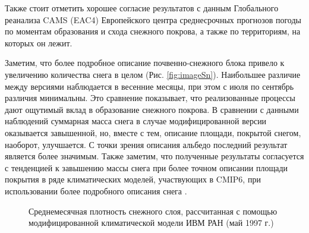 \documentclass[a4paper, fontsize=14pt]{scrartcl}
\begin{document}
\newpage
Также стоит отметить хорошее согласие результатов с данным Глобального реанализа CAMS (EAC4) Европейского центра среднесрочных прогнозов погоды по моментам образования и схода снежного покрова, а также по территориям, на которых он лежит.

Заметим, что более подробное описание почвенно-снежного блока привело к увеличению количества снега в целом (Рис. \ref{fig:imageSn}). Наибольшее различие между версиями наблюдается в весенние месяцы, при этом с июля по сентябрь различия минимальны. Это сравнение показывает, что реализованные процессы дают ощутимый вклад в образование снежного покрова.  В сравнении с данными наблюдений суммарная масса снега в случае модифицированной версии оказывается завышенной, но, вместе с тем, описание площади, покрытой снегом, наоборот, улучшается. С точки зрения описания альбедо последний результат является более значимым. Также заметим, что полученные результаты согласуется с тенденцией к завышению массы снега при более точном описании площади покрытия в ряде климатических моделей, участвующих в CMIP6, при использовании более подробного описания снега \cite{Mudryk2020}.


\begin{figure}[h]
    \caption{Среднемесячная плотность снежного слоя, рассчитанная с помощью модифицированной климатической модели ИВМ РАН (май 1997 г.)}
    \label{fig:image}
\end{figure}
\end{document}

